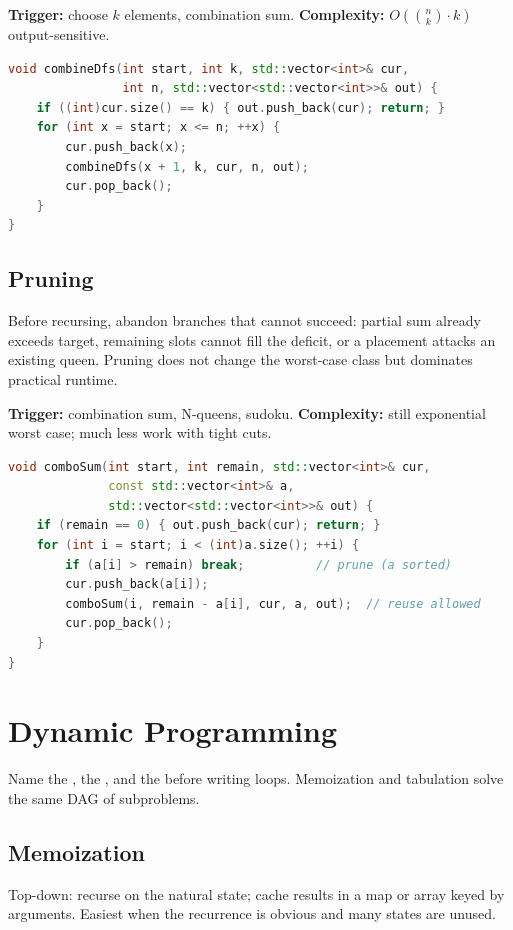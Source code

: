 \textbf{Trigger:} choose $k$ elements, combination sum.
\newline
\textbf{Complexity:} $O\!\left(\binom{n}{k}\cdot k\right)$ output-sensitive.

\begin{lstlisting}[language=C++]
void combineDfs(int start, int k, std::vector<int>& cur,
                int n, std::vector<std::vector<int>>& out) {
    if ((int)cur.size() == k) { out.push_back(cur); return; }
    for (int x = start; x <= n; ++x) {
        cur.push_back(x);
        combineDfs(x + 1, k, cur, n, out);
        cur.pop_back();
    }
}
\end{lstlisting}

\subsection{Pruning}
\label{subsec:pat-prune}
Before recursing, abandon branches that cannot succeed: partial sum already
exceeds target, remaining slots cannot fill the deficit, or a placement attacks
an existing queen. Pruning does not change the worst-case class but dominates
practical runtime.

\textbf{Trigger:} combination sum, N-queens, sudoku.
\newline
\textbf{Complexity:} still exponential worst case; much less work with tight cuts.

\begin{lstlisting}[language=C++]
void comboSum(int start, int remain, std::vector<int>& cur,
              const std::vector<int>& a,
              std::vector<std::vector<int>>& out) {
    if (remain == 0) { out.push_back(cur); return; }
    for (int i = start; i < (int)a.size(); ++i) {
        if (a[i] > remain) break;          // prune (a sorted)
        cur.push_back(a[i]);
        comboSum(i, remain - a[i], cur, a, out);  // reuse allowed
        cur.pop_back();
    }
}
\end{lstlisting}

\section{Dynamic Programming}
\label{sec:pat-dp}
Name the , the , and the 
before writing loops. Memoization and tabulation solve the same DAG of subproblems.

\subsection{Memoization}
\label{subsec:pat-memo}
Top-down: recurse on the natural state; cache results in a map or array keyed by
arguments. Easiest when the recurrence is obvious and many states are unused.


